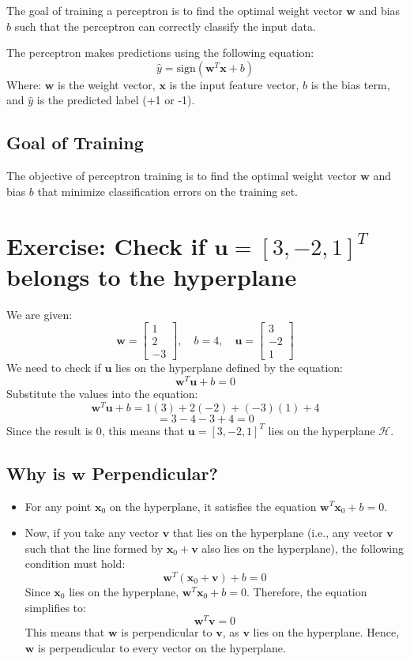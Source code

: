 The goal of training a perceptron is to find the optimal weight vector \( \mathbf{w} \) and bias \( b \) such that the perceptron can correctly classify the input data.

The perceptron makes predictions using the following equation:
\[
\hat{y} = \text{sign}(\mathbf{w}^T \mathbf{x} + b)
\]
Where:
 \( \mathbf{w} \) is the weight vector,
 \( \mathbf{x} \) is the input feature vector,
 \( b \) is the bias term, and
 \( \hat{y} \) is the predicted label (+1 or -1).

\subsection{Goal of Training}
The objective of perceptron training is to find the optimal weight vector \( \mathbf{w} \) and bias \( b \) that minimize classification errors on the training set. 

\section{Exercise: Check if \( \mathbf{u} = [3, -2, 1]^T \) belongs to the hyperplane}

We are given:
\[
\mathbf{w} = \begin{bmatrix} 1 \\ 2 \\ -3 \end{bmatrix}, \quad b = 4, \quad \mathbf{u} = \begin{bmatrix} 3 \\ -2 \\ 1 \end{bmatrix}
\]
We need to check if \( \mathbf{u} \) lies on the hyperplane defined by the equation:
\[
\mathbf{w}^T \mathbf{u} + b = 0
\]
Substitute the values into the equation:
\[
\mathbf{w}^T \mathbf{u} + b = 1(3) + 2(-2) + (-3)(1) + 4
\]
\[
= 3 - 4 - 3 + 4 = 0
\]
Since the result is \( 0 \), this means that \( \mathbf{u} = [3, -2, 1]^T \) lies on the hyperplane \( \mathcal{H} \).


\subsection{Why is \( \mathbf{w} \) Perpendicular?}
\begin{itemize}
    \item For any point \( \mathbf{x}_0 \) on the hyperplane, it satisfies the equation \( \mathbf{w}^T \mathbf{x}_0 + b = 0 \).
    \item Now, if you take any vector \( \mathbf{v} \) that lies on the hyperplane (i.e., any vector \( \mathbf{v} \) such that the line formed by \( \mathbf{x}_0 + \mathbf{v} \) also lies on the hyperplane), the following condition must hold:
    \[
    \mathbf{w}^T (\mathbf{x}_0 + \mathbf{v}) + b = 0
    \]
    Since \( \mathbf{x}_0 \) lies on the hyperplane, \( \mathbf{w}^T \mathbf{x}_0 + b = 0 \). Therefore, the equation simplifies to:
    \[
    \mathbf{w}^T \mathbf{v} = 0
    \]
    This means that \( \mathbf{w} \) is perpendicular to \( \mathbf{v} \), as \( \mathbf{v} \) lies on the hyperplane. Hence, \( \mathbf{w} \) is perpendicular to every vector on the hyperplane.
\end{itemize}

